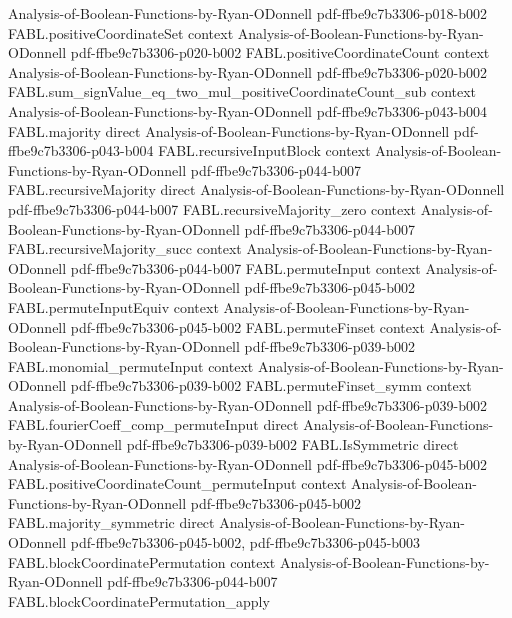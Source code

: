 \begin{theorem}
  {Analysis-of-Boolean-Functions-by-Ryan-ODonnell}
  {pdf-ffbe9c7b3306-p018-b002}
\proofstep
  {FABL.positiveCoordinateSet}
  {context}
  {Analysis-of-Boolean-Functions-by-Ryan-ODonnell}
  {pdf-ffbe9c7b3306-p020-b002}
\proofstep
  {FABL.positiveCoordinateCount}
  {context}
  {Analysis-of-Boolean-Functions-by-Ryan-ODonnell}
  {pdf-ffbe9c7b3306-p020-b002}
\proofstep
  {FABL.sum_signValue_eq_two_mul_positiveCoordinateCount_sub}
  {context}
  {Analysis-of-Boolean-Functions-by-Ryan-ODonnell}
  {pdf-ffbe9c7b3306-p043-b004}
\proofstep
  {FABL.majority}
  {direct}
  {Analysis-of-Boolean-Functions-by-Ryan-ODonnell}
  {pdf-ffbe9c7b3306-p043-b004}
\proofstep
  {FABL.recursiveInputBlock}
  {context}
  {Analysis-of-Boolean-Functions-by-Ryan-ODonnell}
  {pdf-ffbe9c7b3306-p044-b007}
\proofstep
  {FABL.recursiveMajority}
  {direct}
  {Analysis-of-Boolean-Functions-by-Ryan-ODonnell}
  {pdf-ffbe9c7b3306-p044-b007}
\proofstep
  {FABL.recursiveMajority_zero}
  {context}
  {Analysis-of-Boolean-Functions-by-Ryan-ODonnell}
  {pdf-ffbe9c7b3306-p044-b007}
\proofstep
  {FABL.recursiveMajority_succ}
  {context}
  {Analysis-of-Boolean-Functions-by-Ryan-ODonnell}
  {pdf-ffbe9c7b3306-p044-b007}
\proofstep
  {FABL.permuteInput}
  {context}
  {Analysis-of-Boolean-Functions-by-Ryan-ODonnell}
  {pdf-ffbe9c7b3306-p045-b002}
\proofstep
  {FABL.permuteInputEquiv}
  {context}
  {Analysis-of-Boolean-Functions-by-Ryan-ODonnell}
  {pdf-ffbe9c7b3306-p045-b002}
\proofstep
  {FABL.permuteFinset}
  {context}
  {Analysis-of-Boolean-Functions-by-Ryan-ODonnell}
  {pdf-ffbe9c7b3306-p039-b002}
\proofstep
  {FABL.monomial_permuteInput}
  {context}
  {Analysis-of-Boolean-Functions-by-Ryan-ODonnell}
  {pdf-ffbe9c7b3306-p039-b002}
\proofstep
  {FABL.permuteFinset_symm}
  {context}
  {Analysis-of-Boolean-Functions-by-Ryan-ODonnell}
  {pdf-ffbe9c7b3306-p039-b002}
\proofstep
  {FABL.fourierCoeff_comp_permuteInput}
  {direct}
  {Analysis-of-Boolean-Functions-by-Ryan-ODonnell}
  {pdf-ffbe9c7b3306-p039-b002}
\proofstep
  {FABL.IsSymmetric}
  {direct}
  {Analysis-of-Boolean-Functions-by-Ryan-ODonnell}
  {pdf-ffbe9c7b3306-p045-b002}
\proofstep
  {FABL.positiveCoordinateCount_permuteInput}
  {context}
  {Analysis-of-Boolean-Functions-by-Ryan-ODonnell}
  {pdf-ffbe9c7b3306-p045-b002}
\proofstep
  {FABL.majority_symmetric}
  {direct}
  {Analysis-of-Boolean-Functions-by-Ryan-ODonnell}
  {pdf-ffbe9c7b3306-p045-b002,
    pdf-ffbe9c7b3306-p045-b003}
\proofstep
  {FABL.blockCoordinatePermutation}
  {context}
  {Analysis-of-Boolean-Functions-by-Ryan-ODonnell}
  {pdf-ffbe9c7b3306-p044-b007}
\proofstep
  {FABL.blockCoordinatePermutation_apply}

\end{theorem}
